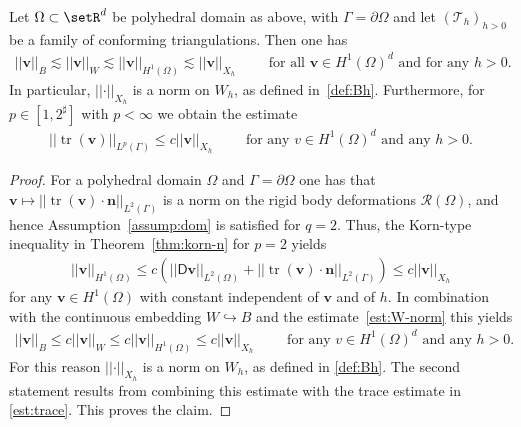 \documentclass[reqno,a4paper]{amsart}
\def\norm#1{\left|\!\left| #1 \right|\!\right|}
\def\tens#1{\pmb{\mathsf{#1}}}
\def\vec#1{\boldsymbol{#1}}
\def\tr{\mathop{\mathrm{tr}}\nolimits}
\def\bn{\vec{n}}
\def\bv{\vec{v}}
\def\BD{\tens{D}}
\def\tria{\mathcal{T}_h}
\begin{document}
\begin{lemma}\label{lem:h-norm}
	Let $\Omega \subset \setR^d$ be polyhedral domain as above, with  $\Gamma = \partial \Omega $ and let $(\tria)_{h>0}$ be a family of conforming triangulations.  
	Then one has 
	\begin{align}\label{est:H1-h}
		\norm{ \bv}_B 
		\lesssim 
		\norm{ \bv}_W  
		\lesssim
		\norm{\bv}_{H^1(\Omega)}
		\lesssim
		\norm{\bv}_{X_h} \qquad \text{ for all } \bv \in H^1(\Omega)^d \text{ and for any } h>0. 
	\end{align}
	In particular, $\norm{\cdot}_{X_h}$ is a norm on $W_h$, as defined in~\eqref{def:Bh}. 
	Furthermore, for $p \in [1,2^\sharp]$ with $p < \infty$ we obtain the estimate 
	\begin{align}\label{est:trace-h}	
		\norm{\tr(\bv)}_{L^{p}(\Gamma)} \leq c \norm{\bv}_{X_h} \qquad \text{ for any } v \in H^1(\Omega)^d \text{ and any } h>0. 
	\end{align}
\end{lemma}
%
\begin{proof}	
	
	For a polyhedral domain $\Omega$ and $\Gamma = \partial \Omega$ one has that $\bv \mapsto \norm{\tr(\bv) \cdot \bn}_{L^2(\Gamma)}$ is a norm on the rigid body deformations $\mathcal{R}(\Omega)$, and hence Assumption~\ref{assump:dom} is satisfied for $q = 2$. 
	Thus, the Korn-type inequality in Theorem~\ref{thm:korn-n} for $p = 2$ yields 
	\begin{align*}
		\norm{\bv}_{H^1(\Omega)} 
		\leq c (\norm{\BD\bv}_{L^2(\Omega)} + \norm{\tr(\bv) \cdot \bn}_{L^2(\Gamma)}) \leq c \norm{\bv}_{X_h}
	\end{align*}
	for any $\bv \in H^1(\Omega)$ with constant independent of $\bv$ and of $h$.  
	In combination with the continuous embedding $W \hookrightarrow B$ and the estimate~\eqref{est:W-norm} this yields 
	\begin{align}\label{est:norm-B-h}	
		\norm{ \bv}_B \leq c \norm{ \bv}_W  \leq c  \norm{\bv}_{H^1(\Omega)} \leq c \norm{\bv}_{X_h} \qquad \text{ for any } v \in H^1(\Omega)^d \text{ and any } h>0. 
	\end{align}
	For this reason $\norm{\cdot}_{X_h}$ is a norm on $W_h$, as defined in \eqref{def:Bh}. 
	The second statement results from combining this estimate with the trace estimate in \eqref{est:trace}. 
	This proves the claim. 
\end{proof}
\end{document}
